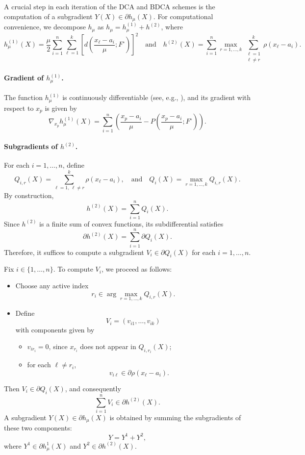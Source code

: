 \documentclass[11pt]{article}
\theoremstyle{definition}
\newcommand{\1}{\mathbf{1}}
\begin{document}
A crucial step in each iteration of the DCA and BDCA schemes is the computation of a subgradient
$Y(X) \in \partial h_{\mu}(X)$. For computational convenience, we decompose
$h_\mu$ as $h_\mu = h^{(1)}_{\mu} + h^{(2)}$, where
\[
h^{(1)}_{\mu}(X)
=
\frac{\mu}{2} \sum_{i=1}^n \sum_{\ell=1}^k
\left[
d\!\left(\frac{x_\ell-a_i}{\mu};F^\circ\right)
\right]^2
\quad\text{and}\quad
h^{(2)}(X)
=
\sum_{i=1}^n
\max_{r=1,\dots,k}
\sum_{\substack{\ell=1\\ \ell\neq r}}^k
\rho(x_\ell-a_i).
\]

\paragraph{Gradient of $h^{(1)}_{\mu}$.}
The function $h^{(1)}_{\mu}$ is continuously differentiable
(see, e.g., \cite[Proposition~3.1]{Nam2017}), and its gradient with respect to
$x_p$ is given by
\[
\nabla_{x_p} h^{(1)}_{\mu}(X)
=
\sum_{i=1}^n
\left(
\frac{x_p-a_i}{\mu}
-
P\!\left(\frac{x_p-a_i}{\mu};F^\circ\right)
\right).
\]

\paragraph{Subgradients of $h^{(2)}$.}
For each $i=1,\ldots,n$, define
\[
Q_{i,r}(X)
=
\sum_{\ell=1,\ \ell\neq r}^{k}
\rho(x_\ell-a_i),
\quad\text{and}\quad
Q_i(X)
=
\max_{r=1,\ldots,k} Q_{i,r}(X).
\]
By construction,
\[
h^{(2)}(X)=\sum_{i=1}^n Q_i(X).
\]
Since $h^{(2)}$ is a finite sum of convex functions, its subdifferential satisfies
\[
\partial h^{(2)}(X)=\sum_{i=1}^n \partial Q_i(X).
\]
Therefore, it suffices to compute a subgradient
$V_i\in\partial Q_i(X)$ for each $i=1,\ldots,n$.

Fix $i\in\{1,\ldots,n\}$. To compute $V_i$, we proceed as follows:
\begin{itemize}
\item[$\circ$]
Choose any active index
\[
r_i \in \arg\max_{r=1,\ldots,k} Q_{i,r}(X).
\]
\item[$\circ$]
Define
\[
V_i=(v_{i1},\ldots,v_{ik})
\]
with components given by
\begin{itemize}
\item $v_{i r_i}=0$, since $x_{r_i}$ does not appear in $Q_{i,r_i}(X)$;
\item for each $\ell\neq r_i$,
\[
v_{i\ell} \in \partial\rho (x_\ell-a_i).
\]
\end{itemize}
\end{itemize}
Then $V_i\in\partial Q_i(X)$, and consequently
\[
\sum_{i=1}^n V_i \in \partial h^{(2)}(X).
\]
A subgradient $Y(X) \in \partial h_\mu(X)$ is obtained by summing the subgradients of these two components: $$Y = Y^1 + Y^2,$$ where $Y^1 \in \partial h^{1}_\mu(X)$ and $Y^2 \in \partial h^{(2)}(X)$.
\end{document}
